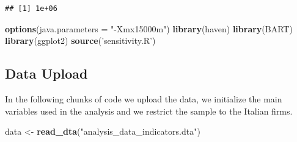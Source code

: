 \documentclass[]{article}
\newenvironment{Shaded}{\begin{snugshade}}{\end{snugshade}}
\newcommand{\DataTypeTok}[1]{\textcolor[rgb]{0.13,0.29,0.53}{#1}}
\newcommand{\DecValTok}[1]{\textcolor[rgb]{0.00,0.00,0.81}{#1}}
\newcommand{\KeywordTok}[1]{\textcolor[rgb]{0.13,0.29,0.53}{\textbf{#1}}}
\newcommand{\NormalTok}[1]{#1}
\newcommand{\OperatorTok}[1]{\textcolor[rgb]{0.81,0.36,0.00}{\textbf{#1}}}
\newcommand{\StringTok}[1]{\textcolor[rgb]{0.31,0.60,0.02}{#1}}
\begin{document}
\begin{verbatim}
## [1] 1e+06
\end{verbatim}

\begin{Shaded}
\begin{Highlighting}[]
\KeywordTok{options}\NormalTok{(}\DataTypeTok{java.parameters =} \StringTok{"-Xmx15000m"}\NormalTok{)}
\KeywordTok{library}\NormalTok{(haven)}
\KeywordTok{library}\NormalTok{(BART)}
\KeywordTok{library}\NormalTok{(ggplot2)}
\KeywordTok{source}\NormalTok{(}\StringTok{'sensitivity.R'}\NormalTok{)}
\end{Highlighting}
\end{Shaded}

\hypertarget{data-upload}{%
\subsection{Data Upload}\label{data-upload}}

In the following chunks of code we upload the data, we initialize the
main variables used in the analysis and we restrict the sample to the
Italian firms.

\begin{Shaded}
\begin{Highlighting}[]
\NormalTok{data <-}\StringTok{ }\KeywordTok{read_dta}\NormalTok{(}\StringTok{"analysis_data_indicators.dta"}\NormalTok{)}
\end{Highlighting}
\end{Shaded}

\begin{Shaded}
\end{Shaded}
\end{document}

